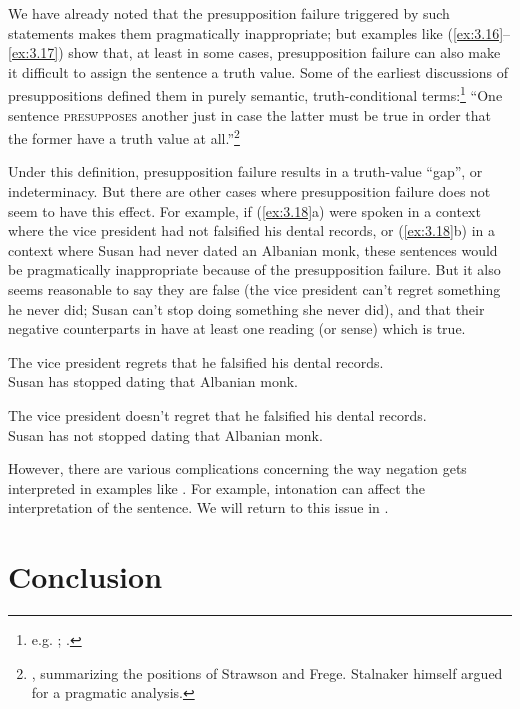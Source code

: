 We have already noted that the presupposition failure triggered by such statements makes them pragmatically inappropriate; but examples like (\ref{ex:3.16}--\ref{ex:3.17}) show that, at least in some cases, presupposition failure can also make it difficult to assign the sentence a truth value. Some of the earliest discussions of presuppositions defined them in purely semantic, truth-conditional terms:\footnote{e.g. \citet{Frege1892}; \citet{Strawson1950,Strawson1952}.} “One sentence \textsc{presupposes} another just in case the latter must be true in order that the former have a truth value at all.”\footnote{\citet[447]{Stalnaker1973}, summarizing the positions of Strawson and Frege. Stalnaker himself argued for a pragmatic analysis.}



Under this definition, presupposition failure results in a truth-value “gap”, or indeterminacy. But there are other cases where presupposition failure does not seem to have this effect. For example, if (\ref{ex:3.18}a) were spoken in a context where the vice president had not falsified his dental records, or (\ref{ex:3.18}b) in a context where Susan had never dated an Albanian monk, these sentences would be pragmatically inappropriate because of the presupposition failure. But it also seems reasonable to say they are false (the vice president can’t regret something he never did; Susan can’t stop doing something she never did), and that their negative counterparts in  have at least one reading (or sense) which is true. 


\ea \label{ex:3.18}
\ea The vice president regrets that he falsified his dental records.\\
\ex Susan has stopped dating that Albanian monk.
\z
                       \z

\ea \label{ex:3.19}
\ea The vice president doesn’t regret that he falsified his dental records.\\
\ex Susan has not stopped dating that Albanian monk.
                       \z
\z


However, there are various complications concerning the way negation gets interpreted in examples like . For example, intonation can affect the interpretation of the sentence. We will return to this issue in .


\section{Conclusion}\label{sec:3.5}

